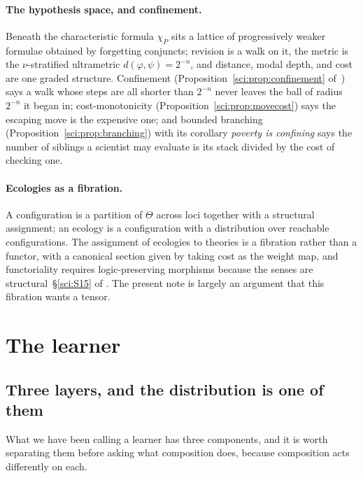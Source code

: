 \paragraph{The hypothesis space, and confinement.}
Beneath the characteristic formula $\chi_P$ sits a lattice of progressively weaker formulae
obtained by forgetting conjuncts; revision is a walk on it, the metric is the $\nu$-stratified
ultrametric $d(\varphi,\psi) = 2^{-n}$, and distance, modal depth, and cost are one graded
structure. Confinement (Proposition~\ref{sci:prop:confinement} of~\chSci) says a walk whose steps are all
shorter than $2^{-n}$ never leaves the ball of radius $2^{-n}$ it began in; cost-monotonicity
(Proposition~\ref{sci:prop:movecost}) says the escaping move is the expensive one; and bounded branching
(Proposition~\ref{sci:prop:branching}) with its corollary \emph{poverty is confining} says the number of siblings a
scientist may evaluate is its stack divided by the cost of checking one.

\paragraph{Ecologies as a fibration.}
A configuration is a partition of $\Theta$ across loci together with a structural assignment; an
ecology is a configuration with a distribution over reachable configurations. The assignment of
ecologies to theories is a fibration rather than a functor, with a canonical section given by
taking cost as the weight map, and functoriality requires logic-preserving morphisms because the
senses are structural~\S\ref{sci:S15} of \chSci. The present note is largely an argument that this
fibration wants a tensor.

\section{The learner}\label{com:sec:learner}\label{com:S3}

\subsection{Three layers, and the distribution is one of them}\label{com:S3.1}

What we have been calling a learner has three components, and it is worth separating them before
asking what composition does, because composition acts differently on each.

